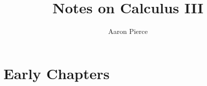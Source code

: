 \documentclass[12pt, letterpaper]{article}
\title{Notes on Calculus III}
\author{Aaron Pierce}
\date{} %
\begin{document}
\maketitle

\tableofcontents

\newpage

\section{Early Chapters}
\end{document}
